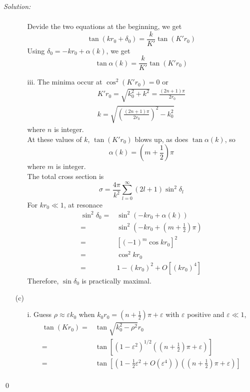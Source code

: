 \documentclass[10pt,a4paper]{article}
\newenvironment{sol}
    {\emph{Solution:}
    }
    {
    \qed
    }
\begin{document}
\begin{sol}
\begin{itemize}
\begin{itemize}
\begin{gather}
\end{gather}
Devide the two equations at the beginning, we get
\begin{equation}
\tan(kr_0+\delta_0)=\frac{k}{K'}\tan(K'r_0)
\end{equation}
Using $\delta_0=-kr_0+\alpha(k)$, we get
\begin{equation}
\tan\alpha(k)=\frac{k}{K'}\tan(K'r_0)
\end{equation}
\item[iii.] The minima occur at $\cos^2(K'r_0)=0$ or
\begin{gather}
K'r_0=\sqrt{k_0^2+k^2}=\frac{(2n+1)\pi}{2r_0}\\
k=\sqrt{\left(\frac{(2n+1)\pi}{2r_0}\right)^2-k_0^2}
\end{gather}
where $n$ is integer.\\
At these values of $k$, $\tan(K'r_0)$ blows up, as does $\tan\alpha(k)$, so
\begin{equation}
\alpha(k)=(m+\frac{1}{2})\pi
\end{equation}
where $m$ is integer.\\
The total cross section is
\begin{equation}
\sigma=\frac{4\pi}{k^2}\sum_{l=0}^{\infty}(2l+1)\sin^2\delta_l
\end{equation}
For $kr_0\ll1$, at resonace
\begin{align}
\nonumber\sin^2\delta_0=&\sin^2(-kr_0+\alpha(k))\\
\nonumber=&\sin^2\left(-kr_0+(m+\frac{1}{2})\pi\right)\\
\nonumber=&\left[(-1)^m\cos kr_0\right]^2\\
\nonumber=&\cos^2kr_0\\
=&1-(kr_0)^2+O[(kr_0)^4]
\end{align}
Therefore, $\sin\delta_0$ is practically maximal.
\end{itemize}
\item[(c)]
\begin{itemize}
\item[i.] Guess $\rho\approx\varepsilon k_0$ when $k_0r_0=(n+\frac{1}{2})\pi+\varepsilon$ with $\varepsilon$ positive and $\varepsilon\ll1$,
\begin{align}
\nonumber\tan(Kr_0)=&\tan\sqrt{k_0^2-\rho^2}r_0\\
\nonumber=&\tan\left[(1-\varepsilon^2)^{1/2}\left((n+\frac{1}{2})\pi+\varepsilon\right)\right]\\
\nonumber=&\tan\left[(1-\frac{1}{2}\varepsilon^2+O(\varepsilon^4))\left((n+\frac{1}{2})\pi+\varepsilon\right)\right]\\

\end{align}
\end{itemize}
\end{itemize}
\end{sol}
\end{document}

